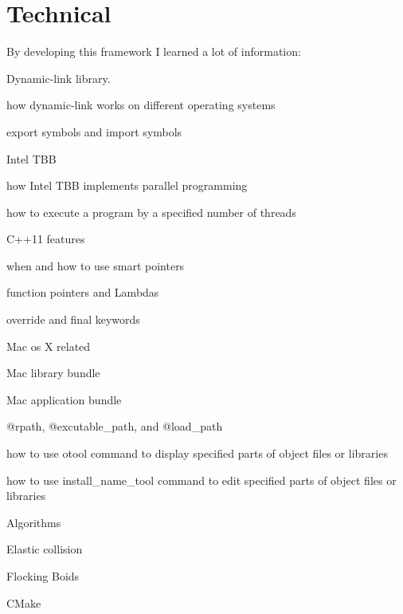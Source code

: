 \hypertarget{_descriptionof_learning_DescriptionofLearningTechnical}{}\section{Technical}\label{_descriptionof_learning_DescriptionofLearningTechnical}
By developing this framework I learned a lot of information\+:
\begin{DoxyItemize}
\item Dynamic-\/link library.
\begin{DoxyItemize}
\item how dynamic-\/link works on different operating systems
\item export symbols and import symbols
\end{DoxyItemize}
\item Intel T\+B\+B
\begin{DoxyItemize}
\item how Intel T\+B\+B implements parallel programming
\item how to execute a program by a specified number of threads
\end{DoxyItemize}
\item C++11 features
\begin{DoxyItemize}
\item when and how to use smart pointers
\item function pointers and Lambdas
\item override and final keywords
\end{DoxyItemize}
\item Mac os X related
\begin{DoxyItemize}
\item Mac library bundle
\item Mac application bundle
\item @rpath, @excutable\+\_\+path, and @load\+\_\+path
\item how to use otool command to display specified parts of object files or libraries
\item how to use install\+\_\+name\+\_\+tool command to edit specified parts of object files or libraries
\end{DoxyItemize}
\item Algorithms
\begin{DoxyItemize}
\item Elastic collision
\item Flocking Boids
\end{DoxyItemize}
\item C\+Make

\end{DoxyItemize}
